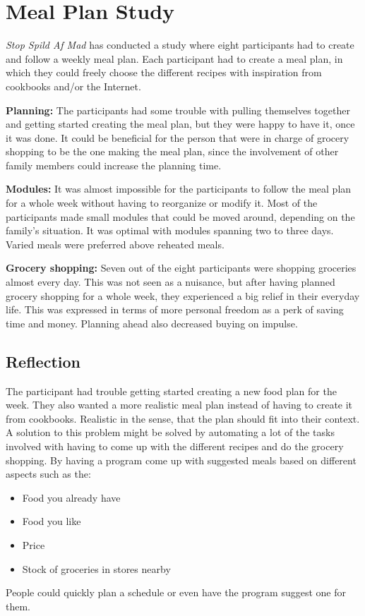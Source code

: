 \section{Meal Plan Study}
\textit{Stop Spild Af Mad}\cite{madSpild_RapportAdfaerd} has conducted a study where eight participants had to create and follow a weekly meal plan.
Each participant had to create a meal plan, in which they could freely choose the different recipes with inspiration from cookbooks and/or the Internet.

\textbf{Planning:}
The participants had some trouble with pulling themselves together and getting started creating the meal plan, but they were happy to have it, once it was done. It could be beneficial for the person that were in charge of grocery shopping to be the one making the meal plan, since the involvement of other family members could increase the planning time.

\textbf{Modules:}
It was almost impossible for the participants to follow the meal plan for a whole week without having to reorganize or modify it. Most of the participants made small modules that could be moved around, depending on the family's situation. It was optimal with modules spanning two to three days. Varied meals were preferred above reheated meals.

\textbf{Grocery shopping:}
Seven out of the eight participants were shopping groceries almost every day. This was not seen as a nuisance, but after having planned grocery shopping for a whole week, they experienced a big relief in their everyday life. This was expressed in terms of more personal freedom as a perk of saving time and money. Planning ahead also decreased buying on impulse.

\subsection{Reflection} \label{FoodPlanStudyReflection}
The participant had trouble getting started creating a new food plan for the week. They also wanted a more realistic meal plan instead of having to create it from cookbooks. Realistic in the sense, that the plan should fit into their context. A solution to this problem might be solved by automating a lot of the tasks involved with having to come up with the different recipes and do the grocery shopping.
By having a program come up with suggested meals based on different aspects such as the:
\begin{itemize}
\item Food you already have
\item Food you like
\item Price
\item Stock of groceries in stores nearby
\end{itemize}
People could quickly plan a schedule or even have the program suggest one for them.